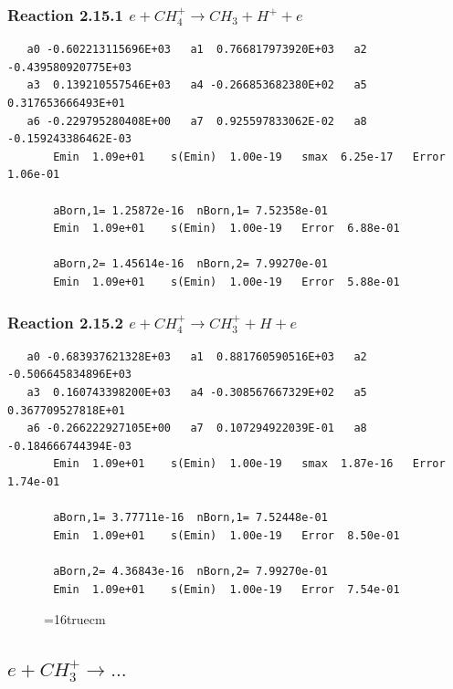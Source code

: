 \documentclass[12pt,dvipdfmx]{article}
\begin{document}
\subsubsection{
Reaction 2.15.1    $e + CH_4^+ \rightarrow CH_3 + H^+ + e $
}

\begin{small}\begin{verbatim}
   a0 -0.602213115696E+03   a1  0.766817973920E+03   a2 -0.439580920775E+03
   a3  0.139210557546E+03   a4 -0.266853682380E+02   a5  0.317653666493E+01
   a6 -0.229795280408E+00   a7  0.925597833062E-02   a8 -0.159243386462E-03
       Emin  1.09e+01    s(Emin)  1.00e-19   smax  6.25e-17   Error  1.06e-01

       aBorn,1= 1.25872e-16  nBorn,1= 7.52358e-01
       Emin  1.09e+01    s(Emin)  1.00e-19   Error  6.88e-01

       aBorn,2= 1.45614e-16  nBorn,2= 7.99270e-01
       Emin  1.09e+01    s(Emin)  1.00e-19   Error  5.88e-01
\end{verbatim}\end{small}

\subsubsection{
Reaction 2.15.2    $e + CH_4^+ \rightarrow CH_3^+ + H + e $
}

\begin{small}\begin{verbatim}
   a0 -0.683937621328E+03   a1  0.881760590516E+03   a2 -0.506645834896E+03
   a3  0.160743398200E+03   a4 -0.308567667329E+02   a5  0.367709527818E+01
   a6 -0.266222927105E+00   a7  0.107294922039E-01   a8 -0.184666744394E-03
       Emin  1.09e+01    s(Emin)  1.00e-19   smax  1.87e-16   Error  1.74e-01

       aBorn,1= 3.77711e-16  nBorn,1= 7.52448e-01
       Emin  1.09e+01    s(Emin)  1.00e-19   Error  8.50e-01

       aBorn,2= 4.36843e-16  nBorn,2= 7.99270e-01
       Emin  1.09e+01    s(Emin)  1.00e-19   Error  7.54e-01
\end{verbatim}\end{small}

\begin{figure} \label{met.1_2.15}
\epsfxsize=16truecm
\end{figure}
\newpage

\subsection{
$e + CH_3^+ \rightarrow ... $
}
\end{document}
